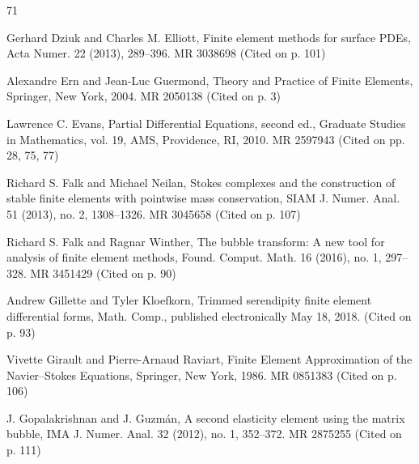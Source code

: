 \begin{MBSourceBibliography}{71}
\item\label{bib:source-39}Gerhard Dziuk and Charles M. Elliott, Finite element methods for surface PDEs, Acta Numer. 22 (2013), 289–396. MR 3038698 (Cited on p. 101)

\item\label{bib:source-40}Alexandre Ern and Jean-Luc Guermond, Theory and Practice of Finite Elements, Springer, New York, 2004. MR 2050138 (Cited on p. 3)

\item\label{bib:source-41}Lawrence C. Evans, Partial Differential Equations, second ed., Graduate Studies in Mathematics, vol. 19, AMS, Providence, RI, 2010. MR 2597943 (Cited on pp. 28, 75, 77)

\item\label{bib:source-42}Richard S. Falk and Michael Neilan, Stokes complexes and the construction of stable finite elements with pointwise mass conservation, SIAM J. Numer. Anal. 51 (2013), no. 2, 1308–1326. MR 3045658 (Cited on p. 107)

\item\label{bib:source-43}Richard S. Falk and Ragnar Winther, The bubble transform: A new tool for analysis of finite element methods, Found. Comput. Math. 16 (2016), no. 1, 297–328. MR 3451429 (Cited on p. 90)

\item\label{bib:source-44}Andrew Gillette and Tyler Kloefkorn, Trimmed serendipity finite element differential forms, Math. Comp., published electronically May 18, 2018. (Cited on p. 93)

\item\label{bib:source-45}Vivette Girault and Pierre-Arnaud Raviart, Finite Element Approximation of the Navier–Stokes Equations, Springer, New York, 1986. MR 0851383 (Cited on p. 106)

\item\label{bib:source-46}J. Gopalakrishnan and J. Guzmán, A second elasticity element using the matrix bubble, IMA J. Numer. Anal. 32 (2012), no. 1, 352–372. MR 2875255 (Cited on p. 111)


\end{MBSourceBibliography}

